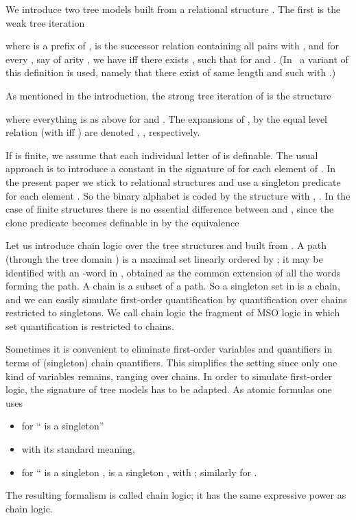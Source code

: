 \documentclass[copyright,creativecommons]{eptcs}
\theoremstyle{plain}
\theoremstyle{nonumberplain}
\begin{document}
We introduce two tree models built from a relational structure . 
The first is the weak tree iteration 
 
where 
  is a prefix of ,  is the successor relation 
containing all pairs  with , and  
for every , say of arity , we have  iff 
there exists ,  such that 
for  and . (In~\cite{bes08}
a variant of this definition is used, namely that there exist
 of same length and  
such  with .) 

As mentioned in the introduction, the strong tree iteration of  is the structure 

where everything is as above for  and . 
The expansions of ,  by the equal level relation  (with  iff 
) are denoted , , respectively. 

If  is finite, we assume that each individual letter of  is definable.
The usual approach is to introduce a constant in the signature of  for each 
element of . In the present paper we stick to relational structures and 
use a singleton predicate  for each element . So the binary 
alphabet  is coded by the structure  with 
, . In the case of finite structures  
there is no essential difference between 
 and , since the clone predicate  becomes definable in  by 
the equivalence 


Let us introduce chain logic over the tree structures  and  
built from .
A path (through the tree domain  
) is a maximal set linearly ordered by ; it may be identified with 
an -word in , obtained as the common extension of all 
the words  forming the path. A chain is a subset of a path. 
So a singleton set in  is a chain, and we can easily simulate first-order quantification 
by quantification over chains restricted to singletons. We call chain logic the fragment 
of MSO logic in which set quantification is restricted to chains. 

Sometimes it is convenient to eliminate first-order variables and quantifiers in 
terms of (singleton) chain quantifiers. This simplifies the setting since only one 
kind  of variables remains, ranging over chains. 
In order to simulate first-order logic, the signature 
of tree models has to be adapted. As atomic formulas  one uses
\begin{itemize}
\item  for `` is a singleton''
\item  with its standard meaning,
\item  for `` is a singleton ,  is a singleton , with ;
similarly for . 
\end{itemize}
The resulting formalism is called chain logic; it has the same expressive 
power as chain logic. 
\end{document}
